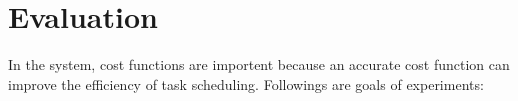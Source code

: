\chapter{Evaluation}









In the system, cost functions are importent because an accurate cost function can improve the efficiency of task scheduling. Followings are goals of experiments:

